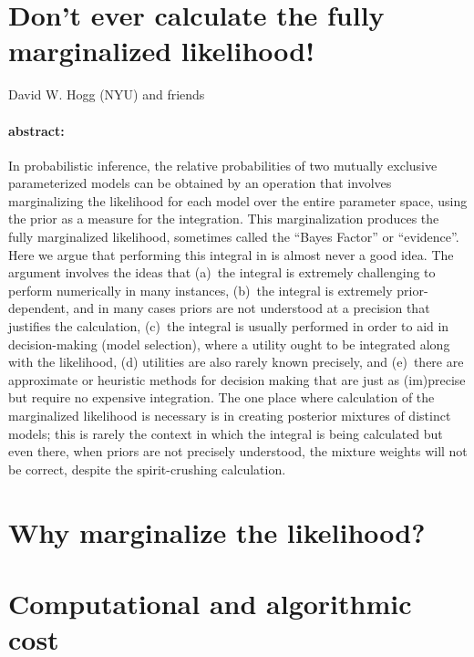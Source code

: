 \documentclass[12pt]{article}
\begin{document}
\section*{Don't ever calculate the fully marginalized likelihood!}

\noindent
David W. Hogg (NYU) and friends

\paragraph{abstract:}
In probabilistic inference, the relative probabilities of two mutually
exclusive parameterized models can be obtained by an operation that
involves marginalizing the likelihood for each model over the entire
parameter space, using the prior as a measure for the integration.
This marginalization produces the fully marginalized likelihood,
sometimes called the ``Bayes Factor'' or ``evidence''.  Here we argue
that performing this integral in is almost never a good idea.  The
argument involves the ideas that (a)~the integral is extremely
challenging to perform numerically in many instances, (b)~the integral
is extremely prior-dependent, and in many cases priors are not
understood at a precision that justifies the calculation, (c)~the
integral is usually performed in order to aid in decision-making
(model selection), where a utility ought to be integrated along with
the likelihood, (d) utilities are also rarely known precisely, and
(e)~there are approximate or heuristic methods for decision making
that are just as (im)precise but require no expensive integration.
The one place where calculation of the marginalized likelihood is
necessary is in creating posterior mixtures of distinct models; this
is rarely the context in which the integral is being calculated but
even there, when priors are not precisely understood, the mixture
weights will not be correct, despite the spirit-crushing calculation.

\section{Why marginalize the likelihood?}


\section{Computational and algorithmic cost}
\end{document}
